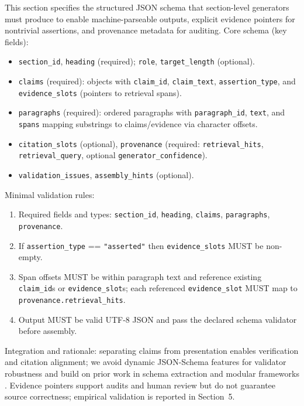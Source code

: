 \documentclass{article}%
\begin{document}
%
This section specifies the structured JSON schema that section-level generators must produce to enable machine-parseable outputs, explicit evidence pointers for nontrivial assertions, and provenance metadata for auditing.
Core schema (key fields):
\begin{itemize}
\item \texttt{section\_id}, \texttt{heading} (required); \texttt{role}, \texttt{target\_length} (optional).
\item \texttt{claims} (required): objects with \texttt{claim\_id}, \texttt{claim\_text}, \texttt{assertion\_type}, and \texttt{evidence\_slots} (pointers to retrieval spans).
\item \texttt{paragraphs} (required): ordered paragraphs with \texttt{paragraph\_id}, \texttt{text}, and \texttt{spans} mapping substrings to claims/evidence via character offsets.
\item \texttt{citation\_slots} (optional), \texttt{provenance} (required: \texttt{retrieval\_hits}, \texttt{retrieval\_query}, optional \texttt{generator\_confidence}).
\item \texttt{validation\_issues}, \texttt{assembly\_hints} (optional).
\end{itemize}
Minimal validation rules:
\begin{enumerate}
\item Required fields and types: \texttt{section\_id}, \texttt{heading}, \texttt{claims}, \texttt{paragraphs}, \texttt{provenance}.
\item If \texttt{assertion\_type} == \texttt{"asserted"} then \texttt{evidence\_slots} MUST be non-empty.
\item Span offsets MUST be within paragraph text and reference existing \texttt{claim\_id}s or \texttt{evidence\_slot}s; each referenced \texttt{evidence\_slot} MUST map to \texttt{provenance.retrieval\_hits}.
\item Output MUST be valid UTF-8 JSON and pass the declared schema validator before assembly.
\end{enumerate}
Integration and rationale: separating claims from presentation enables verification and citation alignment; we avoid dynamic JSON-Schema features for validator robustness \cite{web_attouche_2025_elimination_of_annotation_dependencies_in_valida} and build on prior work in schema extraction and modular frameworks \cite{web_li_2020_schema_extraction_on_semi_structured_data,web_wang_2025_llmatch_a_unified_schema_matching_framework_with}. Evidence pointers support audits and human review but do not guarantee source correctness; empirical validation is reported in Section~5.%
\end{document}
